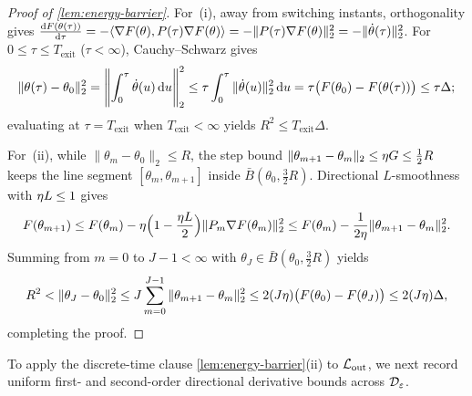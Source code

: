 \begin{proof}[Proof of \cref{lem:energy-barrier}]
For~(i), away from switching instants, orthogonality gives $\ddtau{F(\theta(\tau))} = -\langle\nabla F(\theta), P(\tau)\nabla F(\theta)\rangle = -\|P(\tau)\nabla F(\theta)\|_2^2 = -\|\dot\theta(\tau)\|_2^2$. For $0 \le \tau \le T_{\mathrm{exit}}$ ($\tau < \infty$), Cauchy--Schwarz gives
\[
  \|\theta(\tau) - \theta_0\|_2^2
  = \Biggl\|\int_0^\tau \dot\theta(u)\,\mathrm{d} u\Biggr\|_2^2
  \le \tau\int_0^\tau \|\dot\theta(u)\|_2^2\,\mathrm{d} u
  = \tau\bigl(F(\theta_0) - F(\theta(\tau))\bigr)
  \le \tau\Delta;
\]
evaluating at $\tau = T_{\mathrm{exit}}$ when $T_{\mathrm{exit}} < \infty$ yields $R^2 \le T_{\mathrm{exit}}\Delta$.

For~(ii), while $\|\theta_m - \theta_0\|_2 \le R$, the step bound $\|\theta_{m+1} - \theta_m\|_2 \le \eta G \le \frac{1}{2}R$ keeps the line segment $[\theta_m, \theta_{m+1}]$ inside $\bar B(\theta_0, \frac{3}{2}R)$. Directional $L$-smoothness with $\eta L \le 1$ gives
\[
  F(\theta_{m+1})
  \le F(\theta_m) - \eta\Bigl(1 - \frac{\eta L}{2}\Bigr)\|P_m\nabla F(\theta_m)\|_2^2
  \le F(\theta_m) - \frac{1}{2\eta}\|\theta_{m+1} - \theta_m\|_2^2.
\]
Summing from $m = 0$ to $J - 1 < \infty$ with $\theta_J \in \bar B(\theta_0, \frac{3}{2}R)$ yields
\[
  R^2 < \|\theta_J - \theta_0\|_2^2
  \le J\sum_{m=0}^{J-1}\|\theta_{m+1} - \theta_m\|_2^2
  \le 2(J\eta)\bigl(F(\theta_0) - F(\theta_J)\bigr)
  \le 2(J\eta)\Delta,
\]
completing the proof.
\end{proof}

To apply the discrete-time clause \cref{lem:energy-barrier}(ii) to $\mathcal L_{\mathrm{out}}$, we next record uniform first- and second-order directional derivative bounds across $\mathcal D_{\varepsilon}$.

